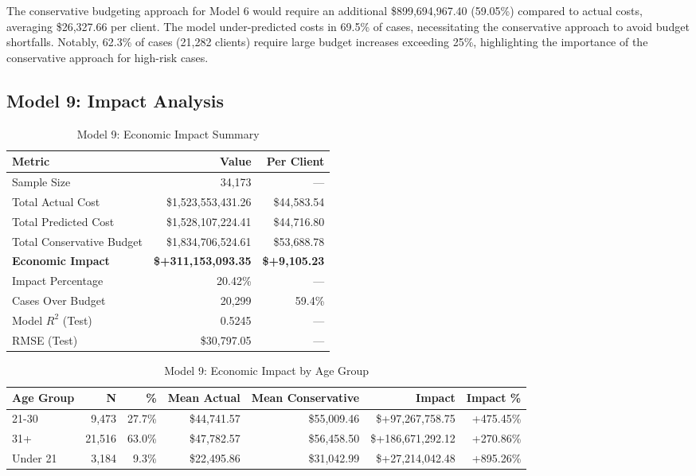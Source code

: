 The conservative budgeting approach for Model 6 would require an additional \$899,694,967.40 (59.05\%) compared to actual costs, averaging \$26,327.66 per client. The model under-predicted costs in 69.5\% of cases, necessitating the conservative approach to avoid budget shortfalls. Notably, 62.3\% of cases (21,282 clients) require large budget increases exceeding 25\%, highlighting the importance of the conservative approach for high-risk cases. 

\clearpage

\subsection{Model 9: Impact Analysis}
\label{subsec:model9_impact}

\begin{table}[htbp]
\centering
\small
\caption{Model 9: Economic Impact Summary}
\label{tab:model9_impact_summary}
\begin{tabular}{lrr}
\toprule
\textbf{Metric} & \textbf{Value} & \textbf{Per Client} \\
\midrule
Sample Size & 34,173 & --- \\
\midrule
Total Actual Cost & \$1,523,553,431.26 & \$44,583.54 \\
Total Predicted Cost & \$1,528,107,224.41 & \$44,716.80 \\
Total Conservative Budget & \$1,834,706,524.61 & \$53,688.78 \\
\midrule
\textbf{Economic Impact} & \textbf{\$+311,153,093.35} & \textbf{\$+9,105.23} \\
Impact Percentage & 20.42\% & --- \\
\midrule
Cases Over Budget & 20,299 & 59.4\% \\
\midrule
Model $R^2$ (Test) & 0.5245 & --- \\
RMSE (Test) & \$30,797.05 & --- \\
\bottomrule
\end{tabular}
\end{table}

\begin{table}[htbp]
\centering
\small
\caption{Model 9: Economic Impact by Age Group}
\label{tab:model9_impact_age}
\begin{tabular}{lrrrrrr}
\toprule
\textbf{Age Group} & \textbf{N} & \textbf{\%} & \textbf{Mean Actual} & \textbf{Mean Conservative} & \textbf{Impact} & \textbf{Impact \%} \\
\midrule
21-30 & 9,473 & 27.7\% & \$44,741.57 & \$55,009.46 & \$+97,267,758.75 & +475.45\% \\
31+ & 21,516 & 63.0\% & \$47,782.57 & \$56,458.50 & \$+186,671,292.12 & +270.86\% \\
Under 21 & 3,184 & 9.3\% & \$22,495.86 & \$31,042.99 & \$+27,214,042.48 & +895.26\% \\
\bottomrule
\end{tabular}
\end{table}

